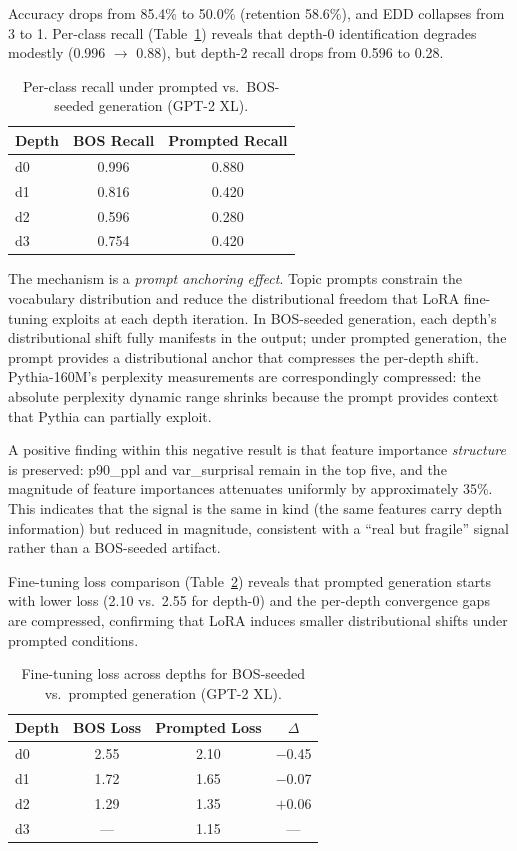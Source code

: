 \documentclass[11pt,a4paper]{article}
\begin{document}
Accuracy drops from 85.4\% to 50.0\% (retention 58.6\%), and EDD collapses from 3 to 1.
Per-class recall (Table~\ref{tab:prompted_recall}) reveals that depth-0 identification degrades modestly (0.996 $\to$ 0.88), but depth-2 recall drops from 0.596 to 0.28.

\begin{table}[t]
\centering
\caption{Per-class recall under prompted vs.\ BOS-seeded generation (GPT-2 XL).}
\label{tab:prompted_recall}
\small
\begin{tabular}{lcc}
\toprule
Depth & BOS Recall & Prompted Recall \\
\midrule
d0 & 0.996 & 0.880 \\
d1 & 0.816 & 0.420 \\
d2 & 0.596 & 0.280 \\
d3 & 0.754 & 0.420 \\
\bottomrule
\end{tabular}
\end{table}

The mechanism is a \emph{prompt anchoring effect}.
Topic prompts constrain the vocabulary distribution and reduce the distributional freedom that LoRA fine-tuning exploits at each depth iteration.
In BOS-seeded generation, each depth's distributional shift fully manifests in the output; under prompted generation, the prompt provides a distributional anchor that compresses the per-depth shift.
Pythia-160M's perplexity measurements are correspondingly compressed: the absolute perplexity dynamic range shrinks because the prompt provides context that Pythia can partially exploit.

A positive finding within this negative result is that feature importance \emph{structure} is preserved: p90\_ppl and var\_surprisal remain in the top five, and the magnitude of feature importances attenuates uniformly by approximately 35\%.
This indicates that the signal is the same in kind (the same features carry depth information) but reduced in magnitude, consistent with a ``real but fragile'' signal rather than a BOS-seeded artifact.

Fine-tuning loss comparison (Table~\ref{tab:loss_comparison}) reveals that prompted generation starts with lower loss (2.10 vs.\ 2.55 for depth-0) and the per-depth convergence gaps are compressed, confirming that LoRA induces smaller distributional shifts under prompted conditions.

\begin{table}[t]
\centering
\caption{Fine-tuning loss across depths for BOS-seeded vs.\ prompted generation (GPT-2 XL).}
\label{tab:loss_comparison}
\small
\begin{tabular}{lccc}
\toprule
Depth & BOS Loss & Prompted Loss & $\Delta$ \\
\midrule
d0 & 2.55 & 2.10 & $-$0.45 \\
d1 & 1.72 & 1.65 & $-$0.07 \\
d2 & 1.29 & 1.35 & $+$0.06 \\
d3 & --- & 1.15 & --- \\
\bottomrule
\end{tabular}
\end{table}
\end{document}
